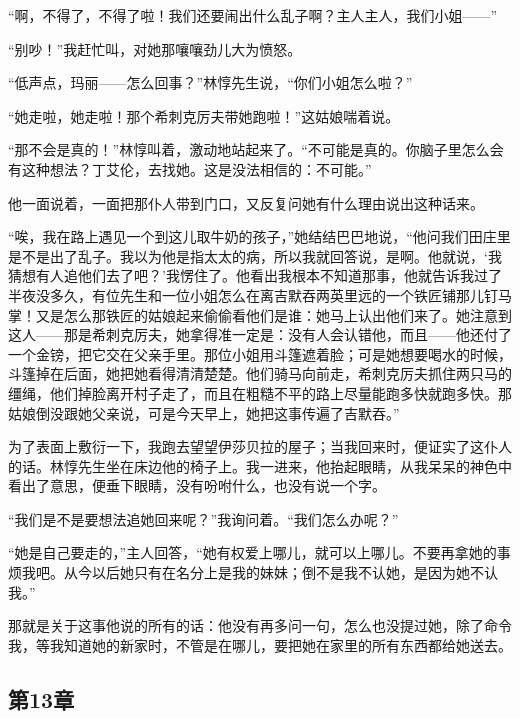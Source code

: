 \par “啊，不得了，不得了啦！我们还要闹出什么乱子啊？主人主人，我们小姐——”
\par “别吵！”我赶忙叫，对她那嚷嚷劲儿大为愤怒。
\par “低声点，玛丽——怎么回事？”林惇先生说，“你们小姐怎么啦？”
\par “她走啦，她走啦！那个希刺克厉夫带她跑啦！”这姑娘喘着说。
\par “那不会是真的！”林惇叫着，激动地站起来了。“不可能是真的。你脑子里怎么会有这种想法？丁艾伦，去找她。这是没法相信的：不可能。”
\par 他一面说着，一面把那仆人带到门口，又反复问她有什么理由说出这种话来。
\par “唉，我在路上遇见一个到这儿取牛奶的孩子，”她结结巴巴地说，“他问我们田庄里是不是出了乱子。我以为他是指太太的病，所以我就回答说，是啊。他就说，‘我猜想有人追他们去了吧？’我愣住了。他看出我根本不知道那事，他就告诉我过了半夜没多久，有位先生和一位小姐怎么在离吉默吞两英里远的一个铁匠铺那儿钉马掌！又是怎么那铁匠的姑娘起来偷偷看他们是谁：她马上认出他们来了。她注意到这人——那是希刺克厉夫，她拿得准一定是：没有人会认错他，而且——他还付了一个金镑，把它交在父亲手里。那位小姐用斗篷遮着脸；可是她想要喝水的时候，斗篷掉在后面，她把她看得清清楚楚。他们骑马向前走，希刺克厉夫抓住两只马的缰绳，他们掉脸离开村子走了，而且在粗糙不平的路上尽量能跑多快就跑多快。那姑娘倒没跟她父亲说，可是今天早上，她把这事传遍了吉默吞。”
\par 为了表面上敷衍一下，我跑去望望伊莎贝拉的屋子；当我回来时，便证实了这仆人的话。林惇先生坐在床边他的椅子上。我一进来，他抬起眼睛，从我呆呆的神色中看出了意思，便垂下眼睛，没有吩咐什么，也没有说一个字。
\par “我们是不是要想法追她回来呢？”我询问着。“我们怎么办呢？”
\par “她是自己要走的，”主人回答，“她有权爱上哪儿，就可以上哪儿。不要再拿她的事烦我吧。从今以后她只有在名分上是我的妹妹；倒不是我不认她，是因为她不认我。”
\par 那就是关于这事他说的所有的话：他没有再多问一句，怎么也没提过她，除了命令我，等我知道她的新家时，不管是在哪儿，要把她在家里的所有东西都给她送去。


\subsection{第13章}

